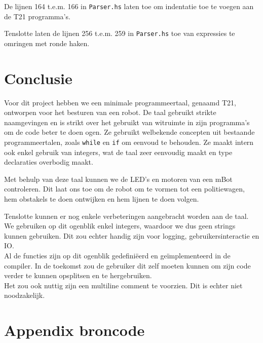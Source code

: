 \documentclass[a4paper]{article}
\begin{document}
\par De lijnen 164 t.e.m. 166 in \verb|Parser.hs| laten toe om indentatie toe te voegen aan de T21 programma's.

\par Tenslotte laten de lijnen 256 t.e.m. 259 in \verb|Parser.hs| toe van expressies te omringen met ronde haken.

\section{Conclusie}
Voor dit project hebben we een minimale programmeertaal, genaamd T21, ontworpen voor het besturen van een robot. De taal gebruikt strikte naamgevingen en is strikt over het gebruikt van witruimte in zijn programma's om de code beter te doen ogen. Ze gebruikt welbekende concepten uit bestaande programmeertalen, zoals \verb|while| en \verb|if| om eenvoud te behouden. Ze maakt intern ook enkel gebruik van integers, wat de taal zeer eenvoudig maakt en type declaraties overbodig maakt.

\par Met behulp van deze taal kunnen we de LED's en motoren van een mBot controleren. Dit laat ons toe om de robot om te vormen tot een politiewagen, hem obstakels te doen ontwijken en hem lijnen te doen volgen.

\par Tenslotte kunnen er nog enkele verbeteringen aangebracht worden aan de taal.\\
We gebruiken op dit ogenblik enkel integers, waardoor we dus geen strings kunnen gebruiken. Dit zou echter handig zijn voor logging, gebruikersinteractie en IO.\\
Al de functies zijn op dit ogenblik gedefini\"eerd en ge\"implementeerd in de compiler. In de toekomst zou de gebruiker dit zelf moeten kunnen om zijn code verder te kunnen opsplitsen en te hergebruiken.\\
Het zou ook nuttig zijn een multiline comment te voorzien. Dit is echter niet noodzakelijk.

\section{Appendix broncode}
\label{sec:broncode}
\inputminted[numbersep=7pt,fontsize=\footnotesize,linenos]{haskell}{../src/Main.hs}
\inputminted[numbersep=7pt,fontsize=\footnotesize,linenos]{haskell}{../src/Interpreter.hs}
\inputminted[numbersep=7pt,fontsize=\footnotesize,linenos]{haskell}{../src/Parser.hs}
\inputminted[numbersep=7pt,fontsize=\footnotesize,linenos]{haskell}{../src/Commander.hs}
\end{document}
